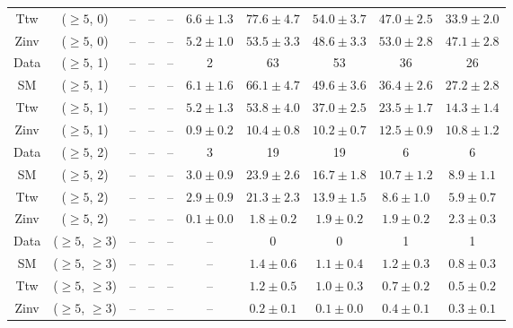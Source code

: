 \begin{table}[h!]
{\begin{tabular}{cccccccccc}
	Ttw & ($\ge5$, 0) & -- & -- & -- & $6.6\pm 1.3$ & $77.6\pm 4.7$ & $54.0\pm 3.7$ & $47.0\pm 2.5$ & $33.9\pm 2.0$ \\[0.5ex] 
	Zinv & ($\ge5$, 0) & -- & -- & -- & $5.2\pm 1.0$ & $53.5\pm 3.3$ & $48.6\pm 3.3$ & $53.0\pm 2.8$ & $47.1\pm 2.8$ \\[0.5ex] 
	Data & ($\ge5$, 1) & -- & -- & -- & 2 & 63 & 53 & 36 & 26 \\[0.5ex] 
	SM & ($\ge5$, 1) & -- & -- & -- & $6.1\pm 1.6$ & $66.1\pm 4.7$ & $49.6\pm 3.6$ & $36.4\pm 2.6$ & $27.2\pm 2.8$ \\[0.5ex] 
	Ttw & ($\ge5$, 1) & -- & -- & -- & $5.2\pm 1.3$ & $53.8\pm 4.0$ & $37.0\pm 2.5$ & $23.5\pm 1.7$ & $14.3\pm 1.4$ \\[0.5ex] 
	Zinv & ($\ge5$, 1) & -- & -- & -- & $0.9\pm 0.2$ & $10.4\pm 0.8$ & $10.2\pm 0.7$ & $12.5\pm 0.9$ & $10.8\pm 1.2$ \\[0.5ex] 
	Data & ($\ge5$, 2) & -- & -- & -- & 3 & 19 & 19 & 6 & 6 \\[0.5ex] 
	SM & ($\ge5$, 2) & -- & -- & -- & $3.0\pm 0.9$ & $23.9\pm 2.6$ & $16.7\pm 1.8$ & $10.7\pm 1.2$ & $8.9\pm 1.1$ \\[0.5ex] 
	Ttw & ($\ge5$, 2) & -- & -- & -- & $2.9\pm 0.9$ & $21.3\pm 2.3$ & $13.9\pm 1.5$ & $8.6\pm 1.0$ & $5.9\pm 0.7$ \\[0.5ex] 
	Zinv & ($\ge5$, 2) & -- & -- & -- & $0.1\pm 0.0$ & $1.8\pm 0.2$ & $1.9\pm 0.2$ & $1.9\pm 0.2$ & $2.3\pm 0.3$ \\[0.5ex] 
	Data & ($\ge5$, $\ge3$) & -- & -- & -- & -- & 0 & 0 & 1 & 1 \\[0.5ex] 
	SM & ($\ge5$, $\ge3$) & -- & -- & -- & -- & $1.4\pm 0.6$ & $1.1\pm 0.4$ & $1.2\pm 0.3$ & $0.8\pm 0.3$ \\[0.5ex] 
	Ttw & ($\ge5$, $\ge3$) & -- & -- & -- & -- & $1.2\pm 0.5$ & $1.0\pm 0.3$ & $0.7\pm 0.2$ & $0.5\pm 0.2$ \\[0.5ex] 
	Zinv & ($\ge5$, $\ge3$) & -- & -- & -- & -- & $0.2\pm 0.1$ & $0.1\pm 0.0$ & $0.4\pm 0.1$ & $0.3\pm 0.1$ \\[0.5ex] 
	\hline
	\hline
\end{tabular}}
\end{table}
